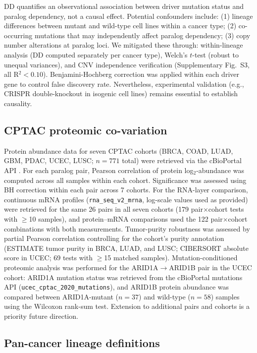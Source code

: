 \documentclass[11pt,a4paper]{article}
\begin{document}
DD quantifies an observational association between driver mutation status and paralog dependency, not a causal effect. Potential confounders include: (1) lineage differences between mutant and wild-type cell lines within a cancer type; (2) co-occurring mutations that may independently affect paralog dependency; (3) copy number alterations at paralog loci. We mitigated these through: within-lineage analysis (DD computed separately per cancer type), Welch's $t$-test (robust to unequal variances), and CNV independence verification (Supplementary Fig.~S3, all R$^2<0.10$). Benjamini-Hochberg correction was applied within each driver gene to control false discovery rate. Nevertheless, experimental validation (e.g., CRISPR double-knockout in isogenic cell lines) remains essential to establish causality.

\subsection*{CPTAC proteomic co-variation}

Protein abundance data for seven CPTAC cohorts (BRCA, COAD, LUAD, GBM, PDAC, UCEC, LUSC; $n=771$ total) were retrieved via the cBioPortal API \cite{Cerami2012,Gao2013}. For each paralog pair, Pearson correlation of protein log$_2$-abundance was computed across all samples within each cohort. Significance was assessed using BH correction within each pair across 7 cohorts. For the RNA-layer comparison, continuous mRNA profiles (\texttt{rna\_seq\_v2\_mrna}, log-scale values used as provided) were retrieved for the same 26 pairs in all seven cohorts (179 pair$\times$cohort tests with $\ge$10 samples), and protein--mRNA comparisons used the 122 pair$\times$cohort combinations with both measurements. Tumor-purity robustness was assessed by partial Pearson correlation controlling for the cohort's purity annotation (ESTIMATE tumor purity in BRCA, LUAD, and LUSC; CIBERSORT absolute score in UCEC; 69 tests with $\ge$15 matched samples). Mutation-conditioned proteomic analysis was performed for the ARID1A$\rightarrow$ARID1B pair in the UCEC cohort: ARID1A mutation status was retrieved from the cBioPortal mutations API (\texttt{ucec\_cptac\_2020\_mutations}), and ARID1B protein abundance was compared between ARID1A-mutant ($n=37$) and wild-type ($n=58$) samples using the Wilcoxon rank-sum test. Extension to additional pairs and cohorts is a priority future direction.

\subsection*{Pan-cancer lineage definitions}
\end{document}
